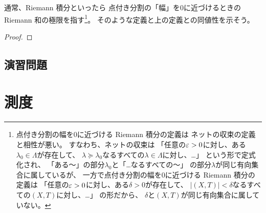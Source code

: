 \documentclass[report]{jlreq}
\begin{document}
通常、Riemann 積分といったら
点付き分割の「幅」を$0$に近づけるときの Riemann 和の極限を指す\footnote{
    点付き分割の幅を$0$に近づける Riemann 積分の定義は
    ネットの収束の定義と相性が悪い。
    すなわち、ネットの収束は
    「任意の$\varepsilon > 0$に対し、ある$\lambda_0 \in \Lambda$が存在して、
    $\lambda \succeq \lambda_0$なるすべての$\lambda \in \Lambda$に対し、…」
    という形で定式化され、
    「ある〜」の部分$\lambda_0$と「…なるすべての〜」
    の部分$\lambda$が同じ有向集合に属しているが、
    一方で点付き分割の幅を$0$に近づける Riemann 積分の定義は
    「任意の$\varepsilon > 0$に対し、ある$\delta > 0$が存在して、
    $|(X, T)| < \delta$なるすべての$(X, T)$に対し、…」
    の形だから、
    $\delta$と$(X, T)$が同じ有向集合に属していない。
}。
そのような定義と上の定義との同値性を示そう。

\begin{proposition}
    \TODO{}
\end{proposition}

\begin{proof}
    \TODO{}
\end{proof}

\begin{definition}[Darboux 積分]
    \TODO{}
\end{definition}

%
\newpage
\section{演習問題}

\begin{problem}[東大数理 2006A]
    
\end{problem}

\begin{answer}
    
\end{answer}




%
\chapter{測度}

%
\end{document}
